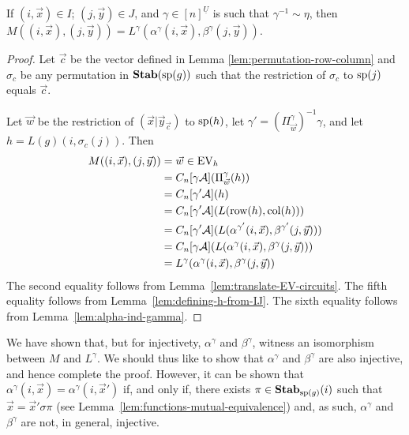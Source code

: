 \documentclass[../paper.tex]{subfiles}
\begin{document}
\begin{thm}
  If $(i, \vec{x})\in I$;  $(j, \vec{y})\in J$, and $\gamma\in
  [n]^{\underline{U}}$ is such that $ \gamma^{-1}
        \sim \eta$,  then $M((i,\vec{x}), (j, \vec{y})) = L^{\gamma}(\alpha^{\gamma}(i, \vec{x}),
  \beta^{\gamma}(j, \vec{y}))$.
	\label{lem:ML-equal-elements}
\end{thm}
\begin{proof}
	Let $\vec{c}$ be the vector defined in Lemma \ref{lem:permutation-row-column}
  and $\sigma_c$ be any permutation in $\text{\textbf{Stab}} (\text{sp} (g))$ such that the restriction of
  $\sigma_c$ to $\text{sp}(j)$ equals $\vec{c}$.
  
  Let $\vec{w}$ be the restriction of $(\vec{x} \vert \vec{y}_{\vec{c}})$ to
  $\text{sp}(h)$, let $\gamma' = (\Pi^{\gamma}_{\vec{w}})^{-1} \gamma$, and let $h
  = L(g)(i, \sigma_c(j))$. Then
	\begin{align*}
		M((i, \vec{x}), (j, \vec{y}))
    & = \vec{w} \in \text{EV}_h                                    \\
    & = C_n[\gamma \mathcal{A}] (\Pi^{\gamma}_{\vec{w}} (h)) \\
    & = C_n[\gamma' \mathcal{A}] (h)                                                             \\
    & = C_n[\gamma' \mathcal{A}](L(\text{row}(h), \text{col} (h)))                                        \\
    & = C_n[\gamma' \mathcal{A}](L(\alpha^{\gamma'}(i, \vec{x}), \beta^{\gamma'}(j, \vec{y})))   \\
    & = C_n[\gamma \mathcal{A}](L(\alpha^{\gamma}(i, \vec{x}), \beta^{\gamma}(j, \vec{y})))     \\
    & = L^{\gamma}(\alpha^{\gamma}(i, \vec{x}), \beta^{\gamma}(j, \vec{y}))                      
	\end{align*}
	The second equality follows from Lemma~\ref{lem:translate-EV-circuits}. The
  fifth equality follows from Lemma~\ref{lem:defining-h-from-IJ}. The sixth
  equality follows from Lemma~\ref{lem:alpha-ind-gamma}.
\end{proof}

We have shown that, but for injectivety, $\alpha^{\gamma}$ and $\beta^{\gamma}$,
witness an isomorphism between $M$ and $L^{\gamma}$. We should
thus like to show that $\alpha^{\gamma}$ and $\beta^{\gamma}$ are also
injective, and hence complete the proof. However, it can be shown that
$\alpha^{\gamma}(i, \vec{x}) = \alpha^{\gamma}(i, \vec{x}')$ if, and only if,
there exists $\pi \in \text{\textbf{Stab}}_{\text{sp}(g)}(i)$ such that $\vec{x} = \vec{x}'\sigma
\pi$ (see Lemma~\ref{lem:functions-mutual-equivalence}) and, as such,
$\alpha^{\gamma}$ and $\beta^{\gamma}$ are not, in general, injective.
\end{document}
